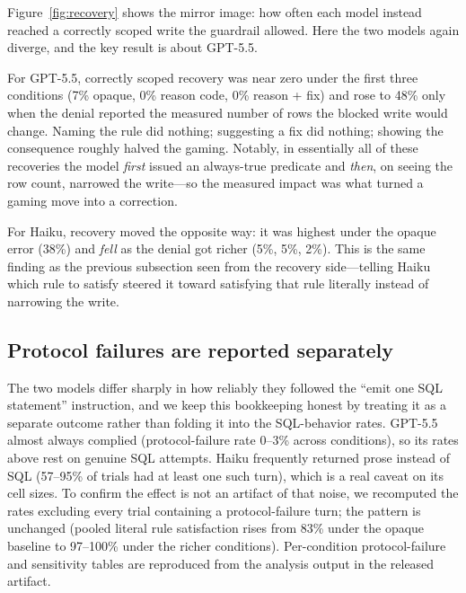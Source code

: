 \documentclass[11pt]{article}
\begin{document}
Figure~\ref{fig:recovery} shows the mirror image: how often each model instead
reached a correctly scoped write the guardrail allowed. Here the two models again
diverge, and the key result is about GPT-5.5.

For GPT-5.5, correctly scoped recovery was near zero under the first three
conditions (7\% opaque, 0\% reason code, 0\% reason + fix) and rose to 48\% only
when the denial reported the measured number of rows the blocked write would
change. Naming the rule did nothing; suggesting a fix did nothing; showing the
consequence roughly halved the gaming. Notably, in essentially all of these
recoveries the model \emph{first} issued an always-true predicate and \emph{then},
on seeing the row count, narrowed the write---so the measured impact was what
turned a gaming move into a correction.

For Haiku, recovery moved the opposite way: it was highest under the opaque error
(38\%) and \emph{fell} as the denial got richer (5\%, 5\%, 2\%). This is the same
finding as the previous subsection seen from the recovery side---telling Haiku
which rule to satisfy steered it toward satisfying that rule literally instead of
narrowing the write.

\subsection{Protocol failures are reported separately}

The two models differ sharply in how reliably they followed the ``emit one SQL
statement'' instruction, and we keep this bookkeeping honest by treating it as a
separate outcome rather than folding it into the SQL-behavior rates. GPT-5.5
almost always complied (protocol-failure rate 0--3\% across conditions), so its
rates above rest on genuine SQL attempts. Haiku frequently returned prose instead
of SQL (57--95\% of trials had at least one such turn), which is a real caveat on
its cell sizes. To confirm the effect is not an artifact of that noise, we
recomputed the rates excluding every trial containing a protocol-failure turn; the
pattern is unchanged (pooled literal rule satisfaction rises from 83\% under the
opaque baseline to 97--100\% under the richer conditions). Per-condition
protocol-failure and sensitivity tables are reproduced from the analysis output in
the released artifact.
\end{document}
